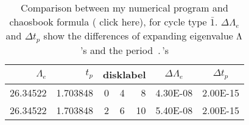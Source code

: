 \begin{table}[htbp]
  \centering
  \caption{Comparison between my numerical program and chaosbook formula  (
    {click here}), for cycle type $\bar{1}$. $\Delta\Lambda_e$ and $\Delta t_p$ show the differences of expanding eigenvalue $\Lambda$'s and  the period $\period{}$'s}
    \begin{tabular}{|r|r|rrr|r|r|}
    \hline
        $\Lambda_e$ & $t_p$    & \multicolumn{3}{c|}{disklabel} &\multicolumn{1}{c|}{ $\Delta\Lambda_e$} & \multicolumn{1}{c|}{$\Delta t_p$} \\\hline
    26.34522 & 1.703848 & 0     & 4     & 8     & 4.30E-08 & 2.00E-15 \\
    26.34522 & 1.703848 & 2     & 6     & 10    & 5.40E-08 & 2.00E-15 \\
	\hline
    \end{tabular}%
  \label{tab:comparison1}%
\end{table}%